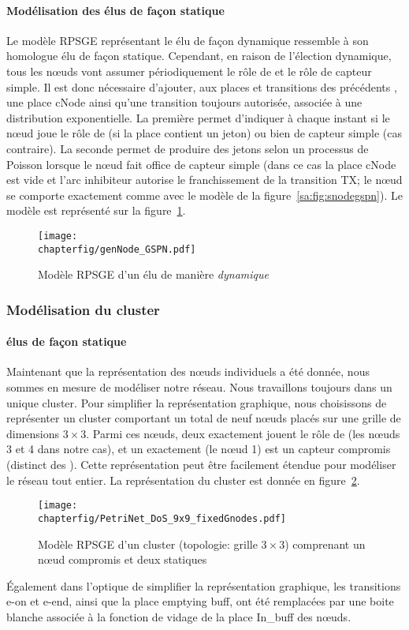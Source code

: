             \paragraph{Modélisation des \cns élus de façon statique}
Le modèle RPSGE représentant le \cn élu de façon dynamique ressemble à son homologue élu de façon statique.
Cependant, en raison de l'élection dynamique, tous les nœuds vont assumer périodiquement le rôle de \cn et le rôle de capteur simple.
Il est donc nécessaire d'ajouter, aux places et transitions des précédents \cns, une place \textsf{cNode} ainsi qu'une transition toujours autorisée, associée à une distribution exponentielle.
La première permet d'indiquer à chaque instant si le nœud joue le rôle de \cn (si la place contient un jeton) ou bien de capteur simple (cas contraire).
La seconde permet de produire des jetons selon un processus de Poisson lorsque le nœud fait office de capteur simple (dans ce cas la place \textsf{cNode} est vide et l'arc inhibiteur autorise le franchissement de la transition \textsf{TX}; le nœud se comporte exactement comme avec le modèle de la figure~\ref{sa:fig:snodegspn}).
Le modèle est représenté sur la figure~\ref{sa:fig:cnodegspn2}.
\begin{figure}[H]
    \centering
    \texttt{[image: \\chapterfig/genNode\_GSPN.pdf]}
    \caption{Modèle RPSGE d'un \cn élu de manière \emph{dynamique}}\label{sa:fig:cnodegspn2}
\end{figure}

        \subsubsection{Modélisation du cluster}

            \paragraph{\cns élus de façon statique}
Maintenant que la représentation des nœuds individuels a été donnée, nous sommes en mesure de modéliser notre réseau.
Nous travaillons toujours dans un unique cluster.
Pour simplifier la représentation graphique, nous choisissons de représenter un cluster comportant un total de neuf nœuds placés sur une grille de dimensions $3\times3$.
Parmi ces nœuds, deux exactement jouent le rôle de \cn (les nœuds \textsf{3} et \textsf{4} dans notre cas), et un exactement (le nœud \textsf{1}) est un capteur compromis (distinct des \cns).
Cette représentation peut être facilement étendue pour modéliser le réseau tout entier.
La représentation du cluster est donnée en figure~\ref{sa:fig:petricluster}.
\begin{figure}[H]
    \centering
    \texttt{[image: \\chapterfig/PetriNet\_DoS\_9x9\_fixedGnodes.pdf]}
    \caption{Modèle RPSGE d'un cluster (topologie: grille $3\times3$) comprenant un nœud compromis et deux \cns statiques}\label{sa:fig:petricluster}
\end{figure}
Également dans l'optique de simplifier la représentation graphique, les transitions \textsf{e-on} et \textsf{e-end}, ainsi que la place \textsf{emptying buff}, ont été remplacées par une boite blanche associée à la fonction de vidage de la place \textsf{In\_buff} des nœuds.

